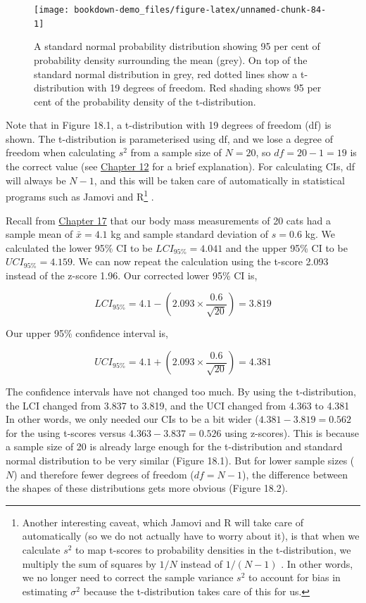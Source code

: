 \documentclass[
]{scrbook}
\begin{document}
\begin{figure}
\texttt{[image: bookdown-demo\_files/figure-latex/unnamed-chunk-84-1]} \caption{A standard normal probability distribution showing 95 per cent of probability density surrounding the mean (grey). On top of the standard normal distribution in grey, red dotted lines show a t-distribution with 19 degrees of freedom. Red shading shows 95 per cent of the probability density of the t-distribution.}\label{fig:unnamed-chunk-84}
\end{figure}

Note that in Figure 18.1, a t-distribution with 19 degrees of freedom (df) is shown.
The t-distribution is parameterised using df, and we lose a degree of freedom when calculating \(s^{2}\) from a sample size of \(N = 20\), so \(df = 20 - 1 = 19\) is the correct value (see \protect\hyperlink{Chapter_12}{Chapter 12} for a brief explanation).
For calculating CIs, df will always be \(N - 1\), and this will be taken care of automatically in statistical programs such as Jamovi and R\footnote{Another interesting caveat, which Jamovi and R will take care of automatically (so we do not actually have to worry about it), is that when we calculate \(s^{2}\) to map t-scores to probability densities in the t-distribution, we multiply the sum of squares by \(1/N\) instead of \(1/(N-1)\) \citep{Sokal1995}. In other words, we no longer need to correct the sample variance \(s^{2}\) to account for bias in estimating \(\sigma^{2}\) because the t-distribution takes care of this for us.} \citep{Jamovi2022, Rproject}.

Recall from \protect\hyperlink{Chapter_17}{Chapter 17} that our body mass measurements of 20 cats had a sample mean of \(\bar{x} = 4.1\) kg and sample standard deviation of \(s = 0.6\) kg. We calculated the lower 95\% CI to be \(LCI_{95\%} = 4.041\) and the upper 95\% CI to be \(UCI_{95\%} = 4.159\). We can now repeat the calculation using the t-score 2.093 instead of the z-score 1.96.
Our corrected lower 95\% CI is,

\[LCI_{95\%} = 4.1 - \left(2.093 \times \frac{0.6}{\sqrt{20}}\right) = 3.819\]

Our upper 95\% confidence interval is,

\[UCI_{95\%} = 4.1 + \left(2.093 \times \frac{0.6}{\sqrt{20}}\right) = 4.381\]

The confidence intervals have not changed too much.
By using the t-distribution, the LCI changed from 3.837 to 3.819, and the UCI changed from 4.363 to 4.381
In other words, we only needed our CIs to be a bit wider (\(4.381 - 3.819 = 0.562\) for the using t-scores versus \(4.363 - 3.837 = 0.526\) using z-scores).
This is because a sample size of 20 is already large enough for the t-distribution and standard normal distribution to be very similar (Figure 18.1).
But for lower sample sizes (\(N\)) and therefore fewer degrees of freedom (\(df = N - 1\)), the difference between the shapes of these distributions gets more obvious (Figure 18.2).
\end{document}
